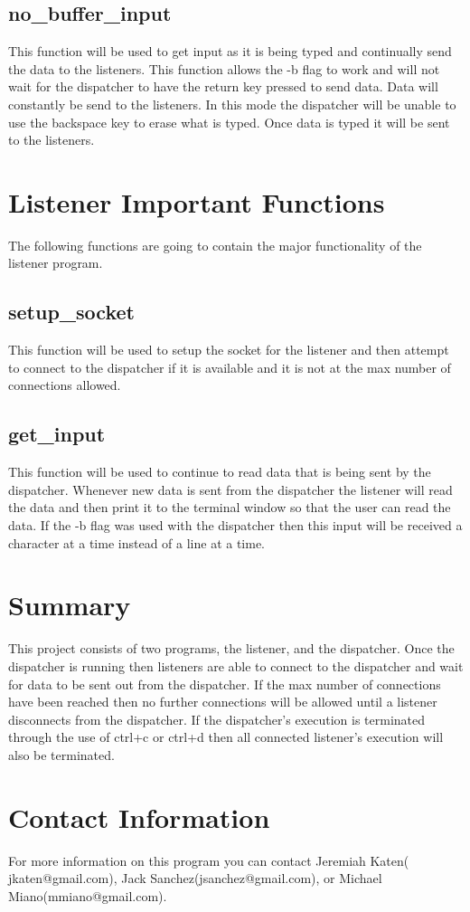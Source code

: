 \documentclass{article}
\begin{document}
\subsection{no\_buffer\_input}
This function will be used to get input as it is being typed and continually send the data to the listeners. This function allows the -b flag to work and will not wait for the dispatcher to have the return key pressed to send data. Data will constantly be send to the listeners. In this mode the dispatcher will be unable to use the backspace key to erase what is typed. Once data is typed it will be sent to the listeners.

\section{Listener Important Functions}
The following functions are going to contain the major functionality of the listener program.

\subsection{setup\_socket}
This function will be used to setup the socket for the listener and then attempt to connect to the dispatcher if it is available and it is not at the max number of connections allowed.

\subsection{get\_input}
This function will be used to continue to read data that is being sent by the dispatcher. Whenever new data is sent from the dispatcher the listener will read the data and then print it to the terminal window so that the user can read the data. If the -b flag was used with the dispatcher then this input will be received a character at a time instead of a line at a time.

\section{Summary}
This project consists of two programs, the listener, and the dispatcher. Once the dispatcher is running then listeners are able to connect to the dispatcher and wait for data to be sent out from the dispatcher. If the max number of connections have been reached then no further connections will be allowed until a listener disconnects from the dispatcher. If the dispatcher's execution is terminated through the use of ctrl+c or ctrl+d then all connected listener's execution will also be terminated.

\section{Contact Information}
For more information on this program you can contact Jeremiah Katen( jkaten@gmail.com), Jack Sanchez(jsanchez@gmail.com), or Michael Miano(mmiano@gmail.com).
\end{document}
